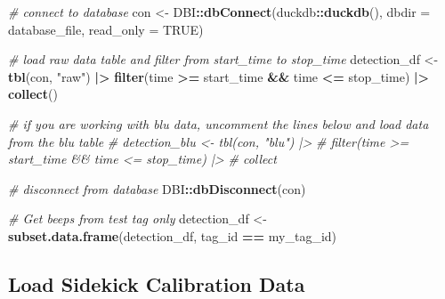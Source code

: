\documentclass[
]{book}
\newenvironment{Shaded}{\begin{snugshade}}{\end{snugshade}}
\newcommand{\AttributeTok}[1]{\textcolor[rgb]{0.13,0.29,0.53}{#1}}
\newcommand{\CommentTok}[1]{\textcolor[rgb]{0.56,0.35,0.01}{\textit{#1}}}
\newcommand{\ConstantTok}[1]{\textcolor[rgb]{0.56,0.35,0.01}{#1}}
\newcommand{\FunctionTok}[1]{\textcolor[rgb]{0.13,0.29,0.53}{\textbf{#1}}}
\newcommand{\NormalTok}[1]{#1}
\newcommand{\OtherTok}[1]{\textcolor[rgb]{0.56,0.35,0.01}{#1}}
\newcommand{\SpecialCharTok}[1]{\textcolor[rgb]{0.81,0.36,0.00}{\textbf{#1}}}
\newcommand{\StringTok}[1]{\textcolor[rgb]{0.31,0.60,0.02}{#1}}
\begin{document}
\begin{Shaded}
\begin{Highlighting}[]
\CommentTok{\# connect to database}
\NormalTok{con }\OtherTok{\textless{}{-}}\NormalTok{ DBI}\SpecialCharTok{::}\FunctionTok{dbConnect}\NormalTok{(duckdb}\SpecialCharTok{::}\FunctionTok{duckdb}\NormalTok{(), }
                      \AttributeTok{dbdir =}\NormalTok{ database\_file, }
                      \AttributeTok{read\_only =} \ConstantTok{TRUE}\NormalTok{)}

\CommentTok{\# load raw data table and filter from start\_time to stop\_time}
\NormalTok{detection\_df }\OtherTok{\textless{}{-}} \FunctionTok{tbl}\NormalTok{(con, }\StringTok{"raw"}\NormalTok{) }\SpecialCharTok{|\textgreater{}} 
  \FunctionTok{filter}\NormalTok{(time }\SpecialCharTok{\textgreater{}=}\NormalTok{ start\_time }\SpecialCharTok{\&\&}\NormalTok{ time }\SpecialCharTok{\textless{}=}\NormalTok{ stop\_time) }\SpecialCharTok{|\textgreater{}}
  \FunctionTok{collect}\NormalTok{()}

\CommentTok{\# if you are working with blu data, uncomment the lines below and load data from the blu table}
\CommentTok{\# detection\_blu \textless{}{-} tbl(con, "blu") |\textgreater{}}
\CommentTok{\#   filter(time \textgreater{}= start\_time \&\& time \textless{}= stop\_time) |\textgreater{}}
\CommentTok{\#   collect}

\CommentTok{\# disconnect from database}
\NormalTok{DBI}\SpecialCharTok{::}\FunctionTok{dbDisconnect}\NormalTok{(con)}

\CommentTok{\# Get beeps from test tag only}
\NormalTok{detection\_df }\OtherTok{\textless{}{-}} \FunctionTok{subset.data.frame}\NormalTok{(detection\_df, }
\NormalTok{                                  tag\_id }\SpecialCharTok{==}\NormalTok{ my\_tag\_id)}
\end{Highlighting}
\end{Shaded}

\subsection{Load Sidekick Calibration Data}\label{load-sidekick-calibration-data}
\end{document}
